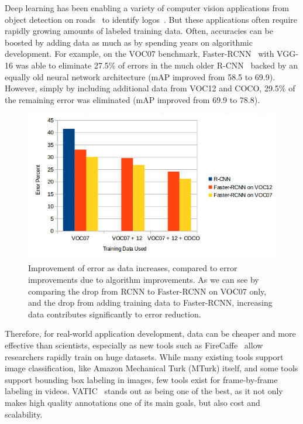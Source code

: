 Deep learning has been enabling a variety of computer vision applications from object detection on roads~\cite{road-obj-detection} to identify logos~\cite{logos}.
But these applications often require rapidly growing amounts of labeled training data.
Often, accuracies can be boosted by adding data as much as by spending years on algorithmic development.
For example, on the VOC07 benchmark, Faster-RCNN~\cite{FasterRCNN} with VGG-16 was able to eliminate 27.5\% of errors in the much older R-CNN~\cite{RCNN} backed by an equally old neural network architecture (mAP improved from 58.5 to 69.9).
However, simply by including additional data from VOC12 and COCO, 29.5\% of the remaining error was eliminated (mAP improved from 69.9 to 78.8).

\begin{figure}[h]
\includegraphics[width=14cm]{figs/data_vs_error.png}
\centering
\caption{Improvement of error as data increases, compared to error improvements due to algorithm improvements.
As we can see by comparing the drop from RCNN to Faster-RCNN on VOC07 only, and the drop from adding training data to Faster-RCNN, increasing data contributes significantly to error reduction.}
\end{figure}

Therefore, for real-world application development, data can be cheaper and more effective than scientists, especially as new tools such as FireCaffe~\cite{firecaffe} allow researchers rapidly train on huge datasets.
While many existing tools support image classification, like Amazon Mechanical Turk (MTurk) itself, and some tools support bounding box labeling in images, few tools exist for frame-by-frame labeling in videos.
VATIC~\cite{Vatic} stands out as being one of the best, as it not only makes high quality annotations one of its main goals, but also cost and scalability.

